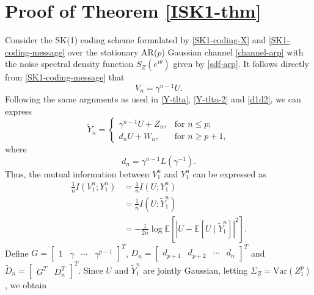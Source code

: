 \documentclass[12pt]{article}
\newcommand{\E}{\mathbb{E}}
\begin{document}
\section{Proof of Theorem \ref{ISK1-thm}}\label{sec:proof_of_theorem_ref_isk1_thm}
Consider the SK(1) coding scheme formulated by \eqref{SK1-coding-X} and \eqref{SK1-coding-message} over the stationary AR($p$) Gaussian channel \eqref{channel-arp} with the noise spectral density function $S_Z(e^{i\theta})$ given by \eqref{sdf-arp}. It follows directly from \eqref{SK1-coding-message} that
\[
   V_n=\gamma^{n-1}U.
\]
Following the same arguments as used in \eqref{Y-tlta}, \eqref{Y-tlta-2} and \eqref{d1d2}, we can express
\begin{equation}
   \widetilde{Y}_n = 
\begin{cases} 
\gamma^{n-1} U + Z_n, & \text{for } n \le p; \\[5pt]
d_n U + W_n, & \text{for } n \ge p+1,
\end{cases}
\end{equation}
where 
\begin{equation}\label{SK1-d}
   d_n = \gamma^{n-1}L(\gamma^{-1}).
\end{equation}
Thus, the mutual information between $V_1^n$ and $Y_1^n$ can be expressed as 
\begin{equation}\label{mutual-info-rate-sk1}
   \begin{aligned}
      \frac{1}{n}I(V_1^n;Y_1^n)&= \frac{1}{n}I(U;Y_1^n)\\
      &=\frac{1}{n}I(U;\widetilde{Y}_1^n)\\
      &=-\frac{1}{2n}\log\E[|U-\E[U\mid\widetilde{Y}_1^n]|^2].
   \end{aligned}
\end{equation}
Define $G =  \begin{bmatrix}
         1 & \gamma &\cdots&\gamma^{p-1}
      \end{bmatrix}^T$, $D_n = \begin{bmatrix}
         d_{p+1} & d_{p+2}&\cdots&d_n
      \end{bmatrix}^T$ and $\widetilde{D}_n = \begin{bmatrix} G^T &D_n^T
      \end{bmatrix}^T$.
Since $U$ and $\widetilde{Y}_1^n$ are jointly Gaussian, letting $\Sigma_Z=\mathrm{Var}(Z_1^p)$, we obtain
\end{document}

